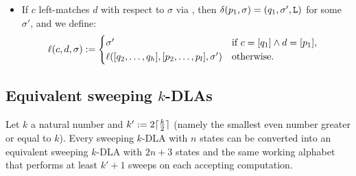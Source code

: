 \begin{defn}
\begin{itemize}
		\item If $c$ left-matches $d$ with respect to $\sigma$ via , then $\delta(p_1,\sigma)=(q_1,\sigma',\mathtt L)$ for some $\sigma'$, and we define:
		      \begin{equation*}
			      \ell(c,d,\sigma):=\begin{cases}
				      \sigma'                                        & \text{if } c=[q_1]\land d=[p_1],~~ \\
				      \ell([q_2,\dots,q_h],[p_2,\dots,p_l],\sigma') & \text{otherwise}.
			      \end{cases}
		      \end{equation*}
	\end{itemize}
\end{defn}


\subsection{Equivalent sweeping \texorpdfstring{$k$}{k}-DLAs}
\begin{thrm}
	Let $k$ a natural number and $k':=2\lceil \frac{k}{2} \rceil$ (namely the smallest even number greater or equal to $k$).
	Every sweeping $k$-DLA with $n$ states can be converted into an equivalent sweeping $k$-DLA with $2n+3$ states and the same working alphabet that performs at least $k'+1$ sweeps on each accepting computation.
\end{thrm}
